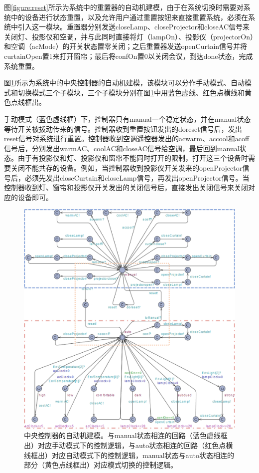 \documentclass[journal, a4paper]{IEEEtran}
\begin{document}
图\ref{figure:reset}所示为系统中的重置器的自动机建模，由于在系统切换时需要对系统中的设备进行状态重置，以及允许用户通过重置按钮来直接重置系统，必须在系统中引入这一模块。重置器分别发送closeLamp、closeProjector和closeAC信号来关闭灯、投影仪和空调，并与此同时直接将灯（lampOn）、投影仪（projectorOn）和空调（acMode）的开关状态置零关闭；之后重置器发送openCurtain信号并将curtainOpen置1来打开窗帘；最后将confOn置0以关闭会议，到达done状态，完成系统重置。

图\ref{figure:controller}所示为系统中的中央控制器的自动机建模，该模块可以分作手动模式、自动模式和切换模式三个子模块，三个子模块分别在图\ref{figure:controller}中用蓝色虚线、红色点横线和黄色点线框出。

手动模式（蓝色虚线框）下，控制器只有manual一个稳定状态，并在manual状态等待开关被拨动传来的信号。控制器收到重置按钮发出的doreset信号后，发出reset信号对系统进行重置。控制器收到空调遥控器发出的acwarm、accool和acoff信号后，分别发出warmAC、coolAC和closeAC信号给空调，最后回到manual状态。由于有投影仪和灯、投影仪和窗帘不能同时打开的限制，打开这三个设备时需要关闭不能共存的设备。例如，当控制器收到投影仪开关发来的openProjector信号后，必须先发出closeCurtain和closeLamp信号，再发出openProjector信号。当控制器收到灯、窗帘和投影仪开关发出的关闭信号后，直接发出关闭信号来关闭对应的设备即可。

\begin{figure}
    \centering
    \includegraphics[width=1.7\columnwidth]{images/Controller.png}
    \caption{中央控制器的自动机建模。与manual状态相连的回路（蓝色虚线框出）对应手动模式下的控制逻辑，与auto状态相连的回路（红色点横线框出）对应自动模式下的控制逻辑，manual状态与auto状态相连的部分（黄色点线框出）对应模式切换的控制逻辑。}
    \label{figure:controller}
\end{figure}
\end{document}
